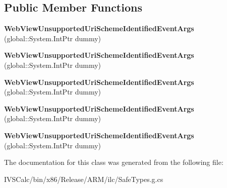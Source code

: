 \subsection*{Public Member Functions}
\begin{DoxyCompactItemize}
\item 
\mbox{\label{class_windows_1_1_u_i_1_1_xaml_1_1_controls_1_1_web_view_unsupported_uri_scheme_identified_event_args_a59ca52d825d8cdf38eedffdefbf4c896}} 
{\bfseries Web\+View\+Unsupported\+Uri\+Scheme\+Identified\+Event\+Args} (global\+::\+System.\+Int\+Ptr dummy)
\item 
\mbox{\label{class_windows_1_1_u_i_1_1_xaml_1_1_controls_1_1_web_view_unsupported_uri_scheme_identified_event_args_a59ca52d825d8cdf38eedffdefbf4c896}} 
{\bfseries Web\+View\+Unsupported\+Uri\+Scheme\+Identified\+Event\+Args} (global\+::\+System.\+Int\+Ptr dummy)
\item 
\mbox{\label{class_windows_1_1_u_i_1_1_xaml_1_1_controls_1_1_web_view_unsupported_uri_scheme_identified_event_args_a59ca52d825d8cdf38eedffdefbf4c896}} 
{\bfseries Web\+View\+Unsupported\+Uri\+Scheme\+Identified\+Event\+Args} (global\+::\+System.\+Int\+Ptr dummy)
\item 
\mbox{\label{class_windows_1_1_u_i_1_1_xaml_1_1_controls_1_1_web_view_unsupported_uri_scheme_identified_event_args_a59ca52d825d8cdf38eedffdefbf4c896}} 
{\bfseries Web\+View\+Unsupported\+Uri\+Scheme\+Identified\+Event\+Args} (global\+::\+System.\+Int\+Ptr dummy)
\item 
\mbox{\label{class_windows_1_1_u_i_1_1_xaml_1_1_controls_1_1_web_view_unsupported_uri_scheme_identified_event_args_a59ca52d825d8cdf38eedffdefbf4c896}} 
{\bfseries Web\+View\+Unsupported\+Uri\+Scheme\+Identified\+Event\+Args} (global\+::\+System.\+Int\+Ptr dummy)
\end{DoxyCompactItemize}


The documentation for this class was generated from the following file\+:\begin{DoxyCompactItemize}
\item 
I\+V\+S\+Calc/bin/x86/\+Release/\+A\+R\+M/ilc/Safe\+Types.\+g.\+cs\end{DoxyCompactItemize}
